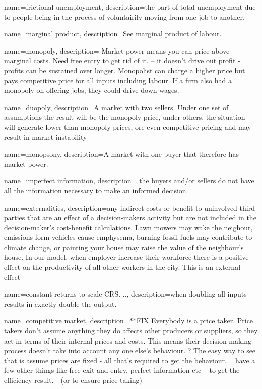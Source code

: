 {
name=frictional unemployment,
description={the part of total unemployment  due to people being in the process of voluntairily moving from one job to another.}
}

{
name=marginal product,
description={See \gls{marginal product of labour}.}
}

{
name=monopoly,
description={ Market power means you can price above marginal costs. Need free entry to get rid of it. -- it doesn't drive out profit - profits can be sustained over longer. Monopolist can charge a higher price but pays competitive price for all inputs including labour. If a firm also had a monopoly on offering jobs, they could drive down wages.}
}

{
name=duopoly,
description={A market with two sellers. Under one set of assumptions the result will  be the monopoly price, under others,  the situation will generate lower  than monopoly prices, ore even competitive pricing and may result in market instability}
}

{
name=monopsony,
description={A market with one buyer that therefore has market power.}
}

{
name=imperfect information,
description={ the buyers and/or sellers do not have all the information necessary to make an informed decision. }
}

{
name=externalities,
description={any indirect costs or benefit to uninvolved third parties that are an effect of a decision-makers activity but are not included in the decision-maker's cost-benefit calculations. Lawn mowers may wake the neighour, emissions form vehicles cause emphysema, burning fossil fuels may contribute to climate change, or painting your house may raise the value of the neighbour's house. In our model, when employer increase their workforce there is a positive effect on the productivity of all other workers in the city. This is an external effect}
}

{
name=constant returns to scale \gls{CRS}. ..,
description={when doubling all inputs results in exactly double the output. }
}

{
name=competitive market,
description={**FIX Everybody is a price taker. Price takers don't assume anything they do affects other producers or suppliers, so they act in terms of their internal prices and costs.
This means their decision making process doesn't take into account any one else's behaviour.
? The easy way to see that is assume prices are fixed - all that's required to get the behaviour. ..  have a few other things like free exit and entry, perfect information etc -- to get the efficiency result. - (or to ensure price taking)}
}

